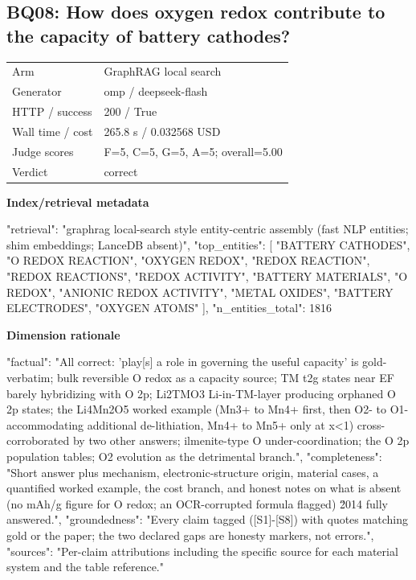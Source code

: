 \documentclass[10pt]{article}
\begin{document}
\subsection{BQ08: How does oxygen redox contribute to the capacity of battery cathodes?}
\begin{tabular}{@{}ll@{}}
Arm & GraphRAG local search\\
Generator & omp / deepseek-flash\\
HTTP / success & 200 / True\\
Wall time / cost & 265.8 s / 0.032568 USD\\
Judge scores & F=5, C=5, G=5, A=5; overall=5.00\\
Verdict & correct\\
\end{tabular}

\textbf{Index/retrieval metadata}
\begin{EvidenceText}
{
  "retrieval": "graphrag local-search style entity-centric assembly (fast NLP entities; shim embeddings; LanceDB absent)",
  "top_entities": [
    "BATTERY CATHODES",
    "O REDOX REACTION",
    "OXYGEN REDOX",
    "REDOX REACTION",
    "REDOX REACTIONS",
    "REDOX ACTIVITY",
    "BATTERY MATERIALS",
    "O REDOX",
    "ANIONIC REDOX ACTIVITY",
    "METAL OXIDES",
    "BATTERY ELECTRODES",
    "OXYGEN ATOMS"
  ],
  "n_entities_total": 1816
}
\end{EvidenceText}

\textbf{Dimension rationale}
\begin{EvidenceText}
{
  "factual": "All correct: 'play[s] a role in governing the useful capacity' is gold-verbatim; bulk reversible O redox as a capacity source; TM t2g states near EF barely hybridizing with O 2p; Li2TMO3 Li-in-TM-layer producing orphaned O 2p states; the Li4Mn2O5 worked example (Mn3+ to Mn4+ first, then O2- to O1- accommodating additional de-lithiation, Mn4+ to Mn5+ only at x<1) cross-corroborated by two other answers; ilmenite-type O under-coordination; the O 2p population tables; O2 evolution as the detrimental branch.",
  "completeness": "Short answer plus mechanism, electronic-structure origin, material cases, a quantified worked example, the cost branch, and honest notes on what is absent (no mAh/g figure for O redox; an OCR-corrupted formula flagged) \u2014 fully answered.",
  "groundedness": "Every claim tagged ([S1]-[S8]) with quotes matching gold or the paper; the two declared gaps are honesty markers, not errors.",
  "sources": "Per-claim attributions including the specific source for each material system and the table reference."
}
\end{EvidenceText}
\end{document}
